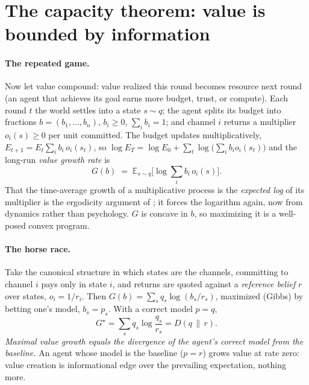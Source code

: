 \documentclass[11pt]{article}
\theoremstyle{plain}
\theoremstyle{definition}
\theoremstyle{remark}
\newcommand{\E}{\mathbb{E}}
\newcommand{\KL}[2]{D\!\left(#1\,\|\,#2\right)}
\begin{document}
\section{The capacity theorem: value is bounded by information}\label{sec:capacity}

\paragraph{The repeated game.} Now let value compound: value realized this round becomes resource next round (an
agent that achieves its goal earns more budget, trust, or compute). Each round $t$ the world settles into a
state $s\sim q$; the agent splits its budget into fractions $b=(b_1,\dots,b_n)$, $b_i\ge0$, $\sum_i b_i=1$; and
channel $i$ returns a multiplier $o_i(s)\ge 0$ per unit committed. The budget updates multiplicatively,
$E_{t+1}=E_t\sum_i b_i\,o_i(s_t)$, so $\log E_T=\log E_0+\sum_t \log\!\big(\sum_i b_i o_i(s_t)\big)$ and the
long-run \emph{value growth rate} is
\begin{equation}\label{eq:G}
G(b)\;=\;\E_{s\sim q}\!\Big[\log\textstyle\sum_i b_i\,o_i(s)\Big].
\end{equation}
That the time-average growth of a multiplicative process is the \emph{expected log} of its multiplier is the
ergodicity argument of \citet{peters2019}; it forces the logarithm again, now from dynamics rather than
psychology. $G$ is concave in $b$, so maximizing it is a well-posed convex program.

\paragraph{The horse race.} Take the canonical structure in which states are the channels, committing to channel
$i$ pays only in state $i$, and returns are quoted against a \emph{reference belief} $r$ over states,
$o_i=1/r_i$. Then $G(b)=\sum_s q_s\log(b_s/r_s)$, maximized (Gibbs) by betting one's model,
$b_s=p_s$. With a correct model $p=q$,
\begin{equation}\label{eq:Gstar}
G^\star=\sum_s q_s\log\frac{q_s}{r_s}=\KL{q}{r}.
\end{equation}
\emph{Maximal value growth equals the divergence of the agent's correct model from the baseline.} An agent whose
model is the baseline ($p=r$) grows value at rate zero: value creation is informational edge over the prevailing
expectation, nothing more.
\end{document}
